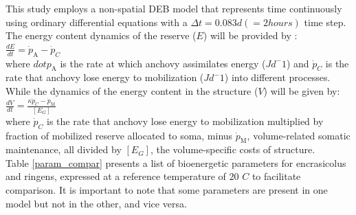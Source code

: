 This study employs a non-spatial DEB model that represents time continuously using ordinary differential equations with a $\Delta t = 0.083 d \left (=2hours\right )$ time step.\\

The energy content dynamics of the reserve ($E$) will be provided by :\\

$\frac{dE}{dt} = \dot{p}_\mathrm{A} - \dot{p}_{C}$\\

where $dot{p}_\mathrm{A}$ is the rate at which anchovy assimilates energy ($Jd^-{1}$) and $\dot{p}_{C}$ is the rate that anchovy lose energy to mobilization ($Jd^-{1}$) into different processes.\\

While the dynamics of the energy content in the structure ($V$) will be given by:\\

$\frac{dV}{dt} = \frac{\kappa \dot{p}_{C} - \dot{p}_\mathrm{M}}{\left[E_{G} \right]}$\\

where $\dot{p}_{C}$ is the rate that anchovy lose energy to mobilization multiplied by fraction of mobilized reserve allocated to soma, minus $\dot{p}_\mathrm{M}$, volume-related somatic maintenance, all divided by $\left[E_{G} \right]$, the volume-specific costs of structure.\\

Table \ref{param_compar} presents a list of bioenergetic parameters for \gls{encrasicolus} and \gls{ringens}, expressed at a reference temperature of $20$ \textdegree $C$ to facilitate comparison. It is important to note that some parameters are present in one model but not in the other, and vice versa.\\

